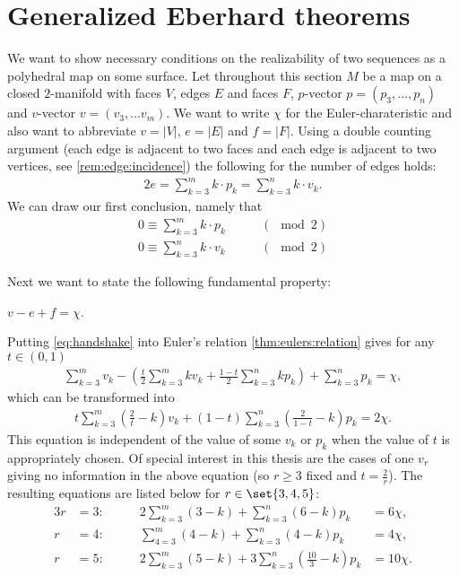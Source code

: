 \section{Generalized {\sc Eberhard} theorems}\label{sec:gen:eberhard}
We want to show necessary conditions on the realizability of two sequences as a polyhedral map on some surface. Let throughout this section $M$ be a map on a closed $2$-manifold with faces $V$, edges $E$ and faces $F$, $p$-vector $p = (p_3, \dots, p_n)$ and $v$-vector $v = (v_3, \dots v_m)$. We want to write $\chi$ for the {\sc Euler}-charateristic and also want to abbreviate $v = |V|$, $e = |E|$ and $f = |F|$. Using a double counting argument (each edge is adjacent to two faces and each edge is adjacent to two vertices, see \autoref{rem:edge:incidence}) the following for the number of edges holds:
\begin{align}
  2e = \sum_{k=3}^{m} k \cdot p_k = \sum_{k=3}^{n} k \cdot v_k \label{eq:handshake}.
\end{align}
We can draw our first conclusion, namely that
\begin{align}
  0 \equiv \sum_{k=3}^{m} k \cdot p_k \qquad &(\mod 2) \label{eq:cond:handshake}\\
  0 \equiv \sum_{k=3}^{n} k \cdot v_k \qquad &(\mod 2) \label{eq:cond:handshake2}
\end{align}

Next we want to state the following fundamental property:
\begin{theorem}\label{thm:eulers:relation} $v - e + f = \chi$.
\end{theorem}

Putting \autoref{eq:handshake} into Euler's relation \autoref{thm:eulers:relation} gives for any $t \in (0, 1)$
\begin{align*}
  \sum_{k=3}^m v_k - \left(\frac{t}{2} \sum_{k=3}^m k v_k + \frac{1-t}{2} \sum_{k=3}^n k p_k \right) + \sum_{k=3}^n p_k = \chi,
\end{align*}
which can be transformed into
\begin{align}
  t \sum_{k=3}^m \left(\frac{2}{t} - k \right) v_k + (1-t) \sum_{k=3}^n \left( \frac{2}{1-t} - k \right) p_k = 2 \chi. \label{eq:general:vp:relation}
\end{align}
This equation is independent of the value of some $v_k$ or $p_k$ when the value of $t$ is appropriately chosen. Of special interest in this thesis are the cases of one $v_r$ giving no information in the above equation (so $r \geq 3$ fixed and $t = \frac{2}{r}$). The resulting equations are listed below for $r \in \set{3, 4, 5}$:
\begin{alignat}{3}
  r &= 3: \qquad &2 \sum_{k=3}^m \left(3 - k \right) +   \sum_{k=3}^n \left(6 - k \right) p_k &= 6 \chi \label{eq:valence:3},\\
  r &= 4: \qquad &  \sum_{4=3}^m \left(4 - k \right) +   \sum_{k=3}^n \left(4 - k \right) p_k &= 4 \chi  \label{eq:valence:4},\\
  r &= 5: \qquad &2 \sum_{k=3}^m \left(5 - k \right) + 3 \sum_{k=3}^n \left( \frac{10}{3} - k \right) p_k &= 10 \chi \label{eq:valence:5}.
\end{alignat}


